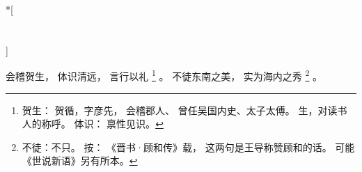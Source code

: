 
\switchcolumn[0]*[\section{}]

会稽贺生，
体识清远，
言行以礼%
\footnote{%
    贺生：
        贺循，字彦先，
        会稽郡人、
        曾任吴国内史、太子太傅。
        生，对读书人的称呼。
    体识：
        禀性见识。
}%
。
不徒东南之美，
实为海内之秀%
\footnote{%
    不徒：不只。
    按：
    《晋书·顾和传》载，
    这两句是王导称赞顾和的话。
    可能《世说新语》另有所本。
}%
。

\switchcolumn


